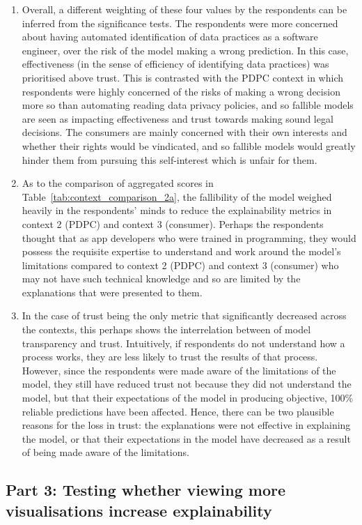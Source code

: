 \begin{enumerate}
    \item Overall, a different weighting of these four values by the respondents can be inferred from the significance tests. The respondents were more concerned about having automated identification of data practices as a software engineer, over the risk of the model making a wrong prediction. In this case, effectiveness (in the sense of efficiency of identifying data practices) was prioritised above trust. This is contrasted with the PDPC context in which respondents were highly concerned of the risks of making a wrong decision more so than automating reading data privacy policies, and so fallible models are seen as impacting effectiveness and trust towards making sound legal decisions. The consumers are mainly concerned with their own interests and whether their rights would be vindicated, and so fallible models would greatly hinder them from pursuing this self-interest which is unfair for them.
    \item As to the comparison of aggregated scores in Table~\ref{tab:context_comparison_2a}, the fallibility of the model weighed heavily in the respondents' minds to reduce the explainability metrics in context 2 (PDPC) and context 3 (consumer). Perhaps the respondents thought that as app developers who were trained in programming, they would possess the requisite expertise to understand and work around the model's limitations compared to context 2 (PDPC) and context 3 (consumer) who may not have such technical knowledge and so are limited by the explanations that were presented to them.
    \item In the case of trust being the only metric that significantly decreased across the contexts, this perhaps shows the interrelation between of model transparency and trust. Intuitively, if respondents do not understand how a process works, they are less likely to trust the results of that process. However, since the respondents were made aware of the limitations of the model, they still have reduced trust not because they did not understand the model, but that their expectations of the model in producing objective, 100\% reliable predictions have been affected. Hence, there can be two plausible reasons for the loss in trust: the explanations were not effective in explaining the model, or that their expectations in the model have decreased as a result of being made aware of the limitations.
\end{enumerate}

\subsection{Part 3: Testing whether viewing more visualisations increase explainability}

